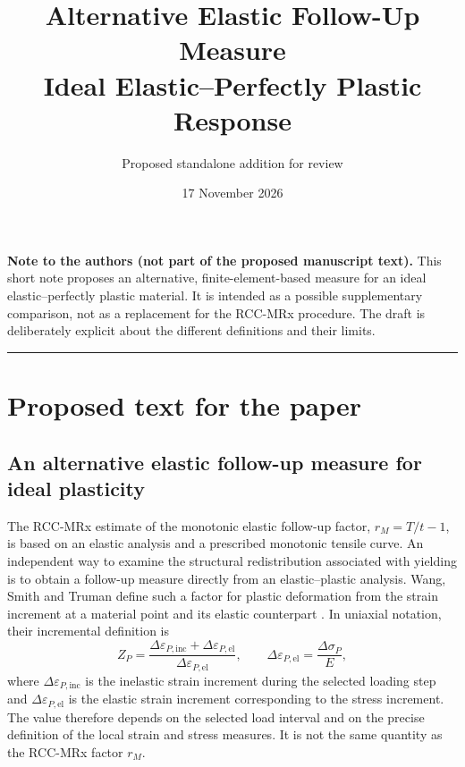 \documentclass[11pt,a4paper]{article}
\title{Alternative Elastic Follow-Up Measure\\
\large Ideal Elastic--Perfectly Plastic Response}
\author{Proposed standalone addition for review}
\date{17 November 2026}
\begin{document}
\maketitle

\textbf{Note to the authors (not part of the proposed manuscript text).}
This short note proposes an alternative, finite-element-based measure for an ideal elastic--perfectly plastic material. It is intended as a possible supplementary comparison, not as a replacement for the RCC-MRx procedure. The draft is deliberately explicit about the different definitions and their limits.

\hrule
\vspace{0.8em}

\section*{Proposed text for the paper}
\subsection*{An alternative elastic follow-up measure for ideal plasticity}

The RCC-MRx estimate of the monotonic elastic follow-up factor, $r_M=T/t-1$, is based on an elastic analysis and a prescribed monotonic tensile curve. An independent way to examine the structural redistribution associated with yielding is to obtain a follow-up measure directly from an elastic--plastic analysis. Wang, Smith and Truman define such a factor for plastic deformation from the strain increment at a material point and its elastic counterpart \cite{Wang2013}. In uniaxial notation, their incremental definition is
\begin{equation}
Z_P =
\frac{\Delta\varepsilon_{P,\mathrm{inc}}+
      \Delta\varepsilon_{P,\mathrm{el}}}
     {\Delta\varepsilon_{P,\mathrm{el}}},
\qquad
\Delta\varepsilon_{P,\mathrm{el}}=
\frac{\Delta\sigma_P}{E},
\label{eq:zp-increment}
\end{equation}
where $\Delta\varepsilon_{P,\mathrm{inc}}$ is the inelastic strain increment during the selected loading step and $\Delta\varepsilon_{P,\mathrm{el}}$ is the elastic strain increment corresponding to the stress increment. The value therefore depends on the selected load interval and on the precise definition of the local strain and stress measures. It is not the same quantity as the RCC-MRx factor $r_M$.
\end{document}
